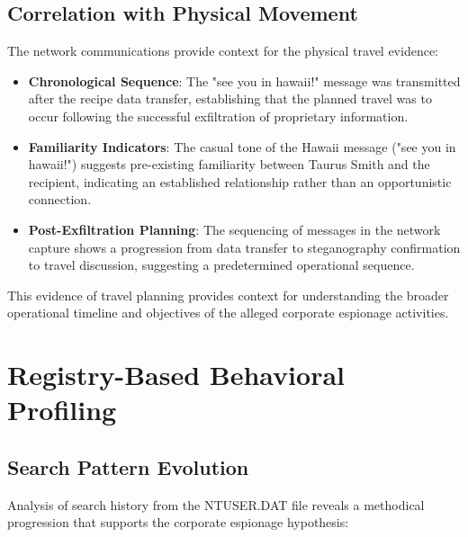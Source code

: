 \subsection{Correlation with Physical Movement}
The network communications provide context for the physical travel evidence:

\begin{itemize}
    \item \textbf{Chronological Sequence}: The "see you in hawaii!" message was transmitted after the recipe data transfer, establishing that the planned travel was to occur following the successful exfiltration of proprietary information.
    
    \item \textbf{Familiarity Indicators}: The casual tone of the Hawaii message ("see you in hawaii!") suggests pre-existing familiarity between Taurus Smith and the recipient, indicating an established relationship rather than an opportunistic connection.
    
    \item \textbf{Post-Exfiltration Planning}: The sequencing of messages in the network capture shows a progression from data transfer to steganography confirmation to travel discussion, suggesting a predetermined operational sequence.
\end{itemize}

This evidence of travel planning provides context for understanding the broader operational timeline and objectives of the alleged corporate espionage activities.

\section{Registry-Based Behavioral Profiling}
\subsection{Search Pattern Evolution}
Analysis of search history from the NTUSER.DAT file reveals a methodical progression that supports the corporate espionage hypothesis:

